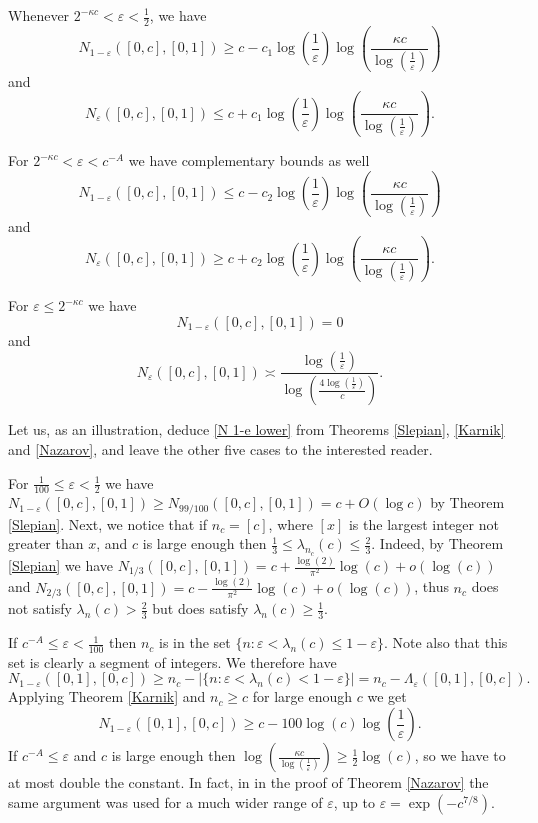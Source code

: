 \documentclass[12pt]{amsart}
\numberwithin{equation}{section}
\newcommand{\eps}{\varepsilon}
\begin{document}
Whenever $2^{-\kappa c} < \eps < \frac{1}{2}$, we have
\begin{equation}\label{N 1-e lower}
N_{1-\eps}([0,c],[0,1]) \ge c - c_1 \log\left(\frac{1}{\eps}\right) \log\left(\frac{\kappa c}{\log(\frac{1}{\eps})}\right)
\end{equation}
and
\begin{equation}\label{N e upper}
N_\eps([0,c],[0,1]) \le c +c_1 \log\left(\frac{1}{\eps}\right) \log\left(\frac{\kappa c}{\log(\frac{1}{\eps})}\right).
\end{equation}

For $2^{-\kappa c} < \eps < c^{-A}$ we have complementary bounds as well
\begin{equation}\label{N 1-e upper}
N_{1-\eps}([0,c],[0,1]) \le c  - c_2 \log\left(\frac{1}{\eps}\right) \log\left(\frac{\kappa c}{\log(\frac{1}{\eps})}\right)
\end{equation}
and
\begin{equation}\label{N e lower}
N_\eps([0,c],[0,1]) \ge c + c_2 \log\left(\frac{1}{\eps}\right) \log\left(\frac{\kappa c}{\log(\frac{1}{\eps})}\right).
\end{equation}

For $\eps \le 2^{-\kappa c}$ we have
$$N_{1-\eps}([0,c],[0,1]) = 0$$
and
$$N_\eps([0, c],[0, 1]) \asymp \frac{\log\left(\frac{1}{\eps}\right)}{\log\left(\frac{4\log\left(\frac{1}{\eps}\right)}{c}\right)}.$$

Let us, as an illustration, deduce \eqref{N 1-e lower} from Theorems \ref{Slepian}, \ref{Karnik} and \ref{Nazarov}, and leave the other five cases to the interested reader. 

For $\frac{1}{100} \le \eps < \frac{1}{2}$ we have $N_{1-\eps}([0,c],[0,1])\ge N_{99/100}([0,c],[0,1]) = c + O(\log c)$ by Theorem \ref{Slepian}. Next, we notice that if $n_c = [c]$, where $[x]$ is the largest integer not greater than $x$, and $c$ is large enough then $\frac{1}{3} \le \lambda_{n_c}(c) \le \frac{2}{3}$. Indeed, by Theorem \ref{Slepian} we have $N_{1/3}([0,c],[0,1]) = c + \frac{\log(2)}{\pi^2}\log(c) + o(\log(c))$ and $N_{2/3}([0,c],[0,1]) = c - \frac{\log(2)}{\pi^2}\log(c) + o(\log(c))$, thus $n_c$ does not satisfy $\lambda_n(c) > \frac{2}{3}$ but does satisfy $\lambda_n(c) \ge \frac{1}{3}$. 

If $c^{-A} \le \eps < \frac{1}{100}$ then $n_c$ is in the set $\{n: \eps < \lambda_n(c) \le 1-\eps\}$. Note also that this set is clearly a segment of integers. We therefore have $$N_{1-\eps}([0,1],[0,c])\ge n_c - |\{n: \eps < \lambda_n(c) < 1-\eps\}| = n_c - \Lambda_\eps([0, 1], [0, c]).$$
Applying Theorem \ref{Karnik} and $n_c \ge c$ for large enough $c$ we get
$$N_{1-\eps}([0,1],[0,c])\ge c - 100\log(c) \log \left(\frac{1}{\eps}\right).$$
If $c^{-A} \le \eps$ and $c$ is large enough then $\log\left(\frac{\kappa c}{\log(\frac{1}{\eps})}\right) \ge \frac{1}{2}\log(c)$, so we have to at most double the constant. In fact, in \cite{kulikov_2026} in the proof of Theorem \ref{Nazarov} the same argument was used for a much wider range of $\eps$, up to $\eps = \exp(-c^{7/8})$.
\end{document}

